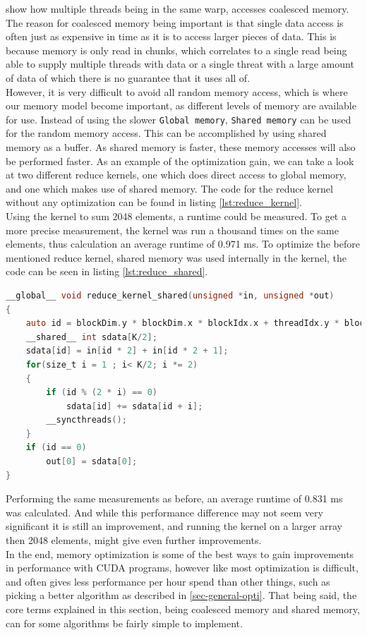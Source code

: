  show how multiple threads being in the same warp, accesses coalesced memory. The reason for coalesced memory being important is that single data access is often just as expensive in time as it is to access larger pieces of data. This is because memory is only read in chunks, which correlates to a single read being able to supply multiple threads with data or a single threat with a large amount of data of which there is no guarantee that it uses all of.\\

However, it is very difficult to avoid all random memory access, which is where our memory model become important, as different levels of memory are available for use. Instead of using the slower \texttt{Global memory}, \texttt{Shared memory} can be used for the random memory access. This can be accomplished by using shared memory as a buffer. As shared memory is faster, these memory accesses will also be performed faster. As an example of the optimization gain, we can take a look at two different reduce kernels, one which does direct access to global memory, and one which makes use of shared memory. The code for the reduce kernel without any optimization can be found in listing \ref{lst:reduce_kernel}.\\

Using the kernel to sum 2048 elements, a runtime could be measured. To get a more precise measurement, the kernel was run a thousand times on the same elements, thus calculation an average runtime of 0.971 ms. To optimize the before mentioned reduce kernel, shared memory was used internally in the kernel, the code can be seen in listing \ref{lst:reduce_shared}.

\begin{lstlisting}[language=C,caption={Optimized reduce kernel, using shared memory},label=lst:reduce_shared]
__global__ void reduce_kernel_shared(unsigned *in, unsigned *out) 
{
	auto id = blockDim.y * blockDim.x * blockIdx.x + threadIdx.y * blockDim.x + threadIdx.x;
	__shared__ int sdata[K/2];
	sdata[id] = in[id * 2] + in[id * 2 + 1];
	for(size_t i = 1 ; i< K/2; i *= 2) 
	{
		if (id % (2 * i) == 0)
			sdata[id] += sdata[id + i];
		__syncthreads();
	}
	if (id == 0) 
		out[0] = sdata[0];
}
\end{lstlisting}

Performing the same measurements as before, an average runtime of 0.831 ms was calculated. And while this performance difference may not seem very significant it is still an improvement, and running the kernel on a larger array then 2048 elements, might give even further improvements.\\

In the end, memory optimization is some of the best ways to gain improvements in performance with CUDA programs, however like most optimization is difficult, and often gives less performance per hour spend than other things, such as picking a better algorithm as described in \cref{sec-general-opti}. That being said, the core terms explained in this section, being coalesced memory and shared memory, can for some algorithms be fairly simple to implement.